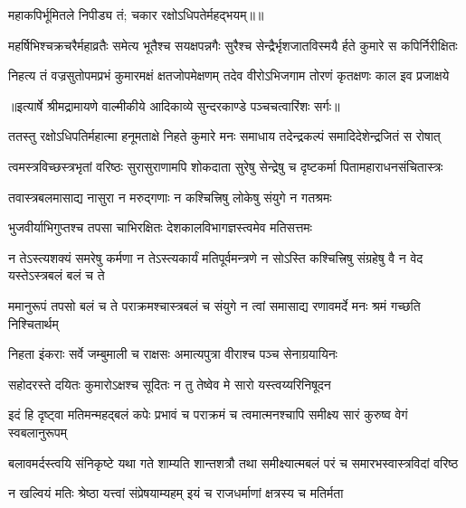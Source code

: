 {महाकपिर्भूमितले निपीड्य तं; चकार रक्षोऽधिपतेर्महद्भयम्॥॥} %

\addtocounter{shlokacount}{1}

\fourlineindentedshloka
{महर्षिभिश्चक्रचरैर्महाव्रतैः}
{ समेत्य भूतैश्च सयक्षपन्नगैः}
{सुरैश्च सेन्द्रैर्भृशजातविस्मयै}
{र्हते कुमारे स कपिर्निरीक्षितः} %

\fourlineindentedshloka
{निहत्य तं वज्रसुतोपमप्रभं}
{ कुमारमक्षं क्षतजोपमेक्षणम्}
{तदेव वीरोऽभिजगाम तोरणं}
{ कृतक्षणः काल इव प्रजाक्षये} %


{॥इत्यार्षे श्रीमद्रामायणे वाल्मीकीये आदिकाव्ये सुन्दरकाण्डे पञ्चचत्वारिंशः सर्गः॥}


\fourlineindentedshloka
{ततस्तु रक्षोऽधिपतिर्महात्मा}
{ हनूमताक्षे निहते कुमारे}
{मनः समाधाय तदेन्द्रकल्पं}
{ समादिदेशेन्द्रजितं स रोषात्} %

\fourlineindentedshloka
{त्वमस्त्रविच्छस्त्रभृतां वरिष्ठः}
{ सुरासुराणामपि शोकदाता}
{सुरेषु सेन्द्रेषु च दृष्टकर्मा}
{ पितामहाराधनसंचितास्त्रः} %

\twolineshloka
{तवास्त्रबलमासाद्य नासुरा न मरुद्गणाः}
{न कश्चित्त्रिषु लोकेषु संयुगे न गतश्रमः} %

\twolineshloka
{भुजवीर्याभिगुप्तश्च तपसा चाभिरक्षितः}
{देशकालविभागज्ञस्त्वमेव मतिसत्तमः} %

\fourlineindentedshloka
{न तेऽस्त्यशक्यं समरेषु कर्मणा}
{ न तेऽस्त्यकार्यं मतिपूर्वमन्त्रणे}
{न सोऽस्ति कश्चित्त्रिषु संग्रहेषु वै}
{ न वेद यस्तेऽस्त्रबलं बलं च ते} %

\fourlineindentedshloka
{ममानुरूपं तपसो बलं च ते}
{ पराक्रमश्चास्त्रबलं च संयुगे}
{न त्वां समासाद्य रणावमर्दे}
{ मनः श्रमं गच्छति निश्चितार्थम्} %

\twolineshloka
{निहता इंकराः सर्वे जम्बुमाली च राक्षसः}
{अमात्यपुत्रा वीराश्च पञ्च सेनाग्रयायिनः} %

\twolineshloka
{सहोदरस्ते दयितः कुमारोऽक्षश्च सूदितः}
{न तु तेष्वेव मे सारो यस्त्वय्यरिनिषूदन} %

\fourlineindentedshloka
{इदं हि दृष्ट्वा मतिमन्महद्बलं}
{ कपेः प्रभावं च पराक्रमं च}
{त्वमात्मनश्चापि समीक्ष्य सारं}
{ कुरुष्व वेगं स्वबलानुरूपम्} %

\fourlineindentedshloka
{बलावमर्दस्त्वयि संनिकृष्टे}
{ यथा गते शाम्यति शान्तशत्रौ}
{तथा समीक्ष्यात्मबलं परं च}
{ समारभस्वास्त्रविदां वरिष्ठ} %

\twolineshloka
{न खल्वियं मतिः श्रेष्ठा यत्त्वां संप्रेषयाम्यहम्}
{इयं च राजधर्माणां क्षत्रस्य च मतिर्मता} %

